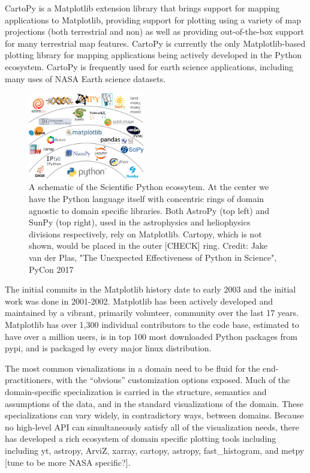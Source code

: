 \documentclass[12pt]{article}
\numberwithin{page}{section}
\begin{document}
CartoPy is a Matplotlib extension library that brings support for
mapping applications to Matplotlib, providing support for plotting
using a variety of map projections (both terrestrial and non) as well
as providing out-of-the-box support for many terrestrial map
features. CartoPy is currently the only Matplotlib-based plotting
library for mapping applications being actively developed in the
Python ecosystem. CartoPy is frequently used for earth science
applications, including many uses of NASA Earth science datasets.

\begin{figure}
  \includegraphics[width=0.45\textwidth]{scipy-ecosystem}
  \caption{A schematic of the Scientific Python ecossytem.  At the
    center we have the Python language itself with concentric rings of
    domain agnostic to domain specific libraries.  Both AstroPy (top
    left) and SunPy (top right), used in the astrophysics and
    heliophysics divisions respectively, rely on Matplotlib. Cartopy,
    which is not shown, would be placed in the outer [CHECK] ring.
    Credit: Jake van der Plas, "The Unexpected Effectiveness of Python
    in Science", PyCon 2017}
  \label{fig:ecosystem}
\end{figure}


The initial commits in the Matplotlib history date to early 2003 and
the initial work was done in 2001-2002. Matplotlib has been actively
developed and maintained by a vibrant, primarily volunteer, community
over the last 17 years.  Matplotlib has over 1,300 individual
contributors to the code base, estimated to have over a million users,
is in top 100 most downloaded Python packages from pypi, and is packaged
by every major linux distribution.

The most common visualizations in a domain need to be fluid for the
end-practitioners, with the ``obvious'' customization options
exposed. Much of the domain-specific specialization is carried in the
structure, semantics and assumptions of the data, and in the standard
visualizations of the domain. These specializations can vary widely,
in contradictory ways, between domains. Because no high-level API can
simultaneously satisfy all of the visualization needs, there has
developed a rich ecosystem of domain specific plotting tools including
including yt, astropy, ArviZ, xarray, cartopy, astropy,
fast\_histogram, and metpy [tune to be more NASA specific?].
\end{document}

